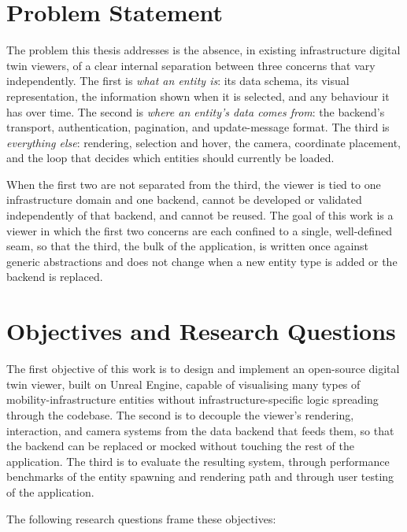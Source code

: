 \section{Problem Statement}
\label{sec:problem}

The problem this thesis addresses is the absence, in existing infrastructure digital twin viewers, of a clear internal separation between three concerns that vary independently. The first is \emph{what an entity is}: its data schema, its visual representation, the information shown when it is selected, and any behaviour it has over time. The second is \emph{where an entity's data comes from}: the backend's transport, authentication, pagination, and update-message format. The third is \emph{everything else}: rendering, selection and hover, the camera, coordinate placement, and the loop that decides which entities should currently be loaded.

When the first two are not separated from the third, the viewer is tied to one infrastructure domain and one backend, cannot be developed or validated independently of that backend, and cannot be reused. The goal of this work is a viewer in which the first two concerns are each confined to a single, well-defined seam, so that the third, the bulk of the application, is written once against generic abstractions and does not change when a new entity type is added or the backend is replaced.

\section{Objectives and Research Questions}
\label{sec:objectives}

The first objective of this work is to design and implement an open-source digital twin viewer, built on Unreal Engine, capable of visualising many types of mobility-infrastructure entities without infrastructure-specific logic spreading through the codebase. The second is to decouple the viewer's rendering, interaction, and camera systems from the data backend that feeds them, so that the backend can be replaced or mocked without touching the rest of the application. The third is to evaluate the resulting system, through performance benchmarks of the entity spawning and rendering path and through user testing of the application.

The following research questions frame these objectives:

